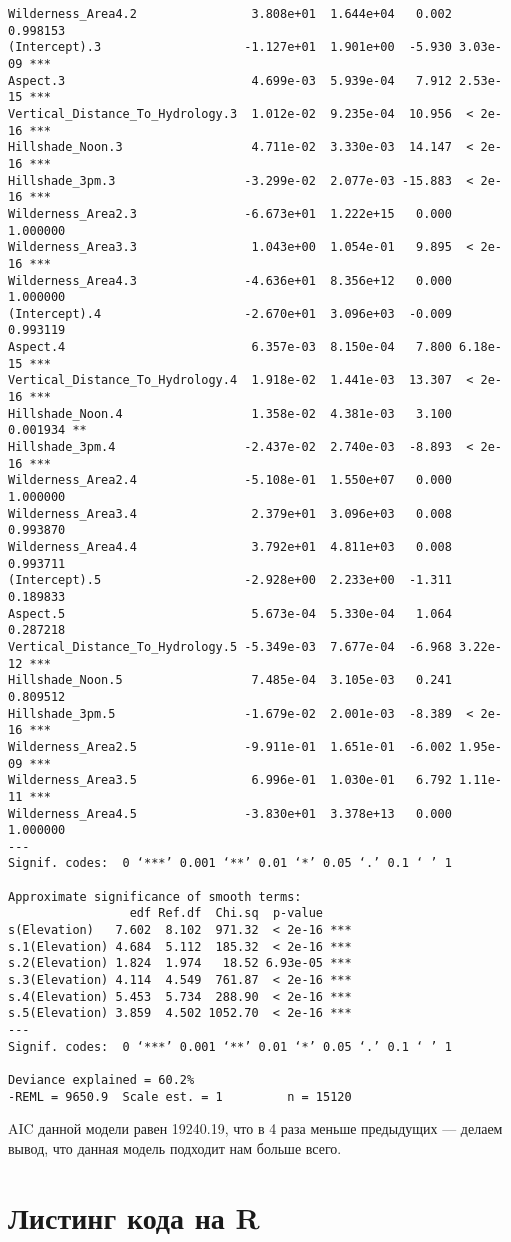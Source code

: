 \documentclass[12pt]{article}
\begin{document}
\begin{verbatim}
Wilderness_Area4.2                3.808e+01  1.644e+04   0.002 0.998153
(Intercept).3                    -1.127e+01  1.901e+00  -5.930 3.03e-09 ***
Aspect.3                          4.699e-03  5.939e-04   7.912 2.53e-15 ***
Vertical_Distance_To_Hydrology.3  1.012e-02  9.235e-04  10.956  < 2e-16 ***
Hillshade_Noon.3                  4.711e-02  3.330e-03  14.147  < 2e-16 ***
Hillshade_3pm.3                  -3.299e-02  2.077e-03 -15.883  < 2e-16 ***
Wilderness_Area2.3               -6.673e+01  1.222e+15   0.000 1.000000
Wilderness_Area3.3                1.043e+00  1.054e-01   9.895  < 2e-16 ***
Wilderness_Area4.3               -4.636e+01  8.356e+12   0.000 1.000000
(Intercept).4                    -2.670e+01  3.096e+03  -0.009 0.993119
Aspect.4                          6.357e-03  8.150e-04   7.800 6.18e-15 ***
Vertical_Distance_To_Hydrology.4  1.918e-02  1.441e-03  13.307  < 2e-16 ***
Hillshade_Noon.4                  1.358e-02  4.381e-03   3.100 0.001934 **
Hillshade_3pm.4                  -2.437e-02  2.740e-03  -8.893  < 2e-16 ***
Wilderness_Area2.4               -5.108e-01  1.550e+07   0.000 1.000000
Wilderness_Area3.4                2.379e+01  3.096e+03   0.008 0.993870
Wilderness_Area4.4                3.792e+01  4.811e+03   0.008 0.993711
(Intercept).5                    -2.928e+00  2.233e+00  -1.311 0.189833
Aspect.5                          5.673e-04  5.330e-04   1.064 0.287218
Vertical_Distance_To_Hydrology.5 -5.349e-03  7.677e-04  -6.968 3.22e-12 ***
Hillshade_Noon.5                  7.485e-04  3.105e-03   0.241 0.809512
Hillshade_3pm.5                  -1.679e-02  2.001e-03  -8.389  < 2e-16 ***
Wilderness_Area2.5               -9.911e-01  1.651e-01  -6.002 1.95e-09 ***
Wilderness_Area3.5                6.996e-01  1.030e-01   6.792 1.11e-11 ***
Wilderness_Area4.5               -3.830e+01  3.378e+13   0.000 1.000000
---
Signif. codes:  0 ‘***’ 0.001 ‘**’ 0.01 ‘*’ 0.05 ‘.’ 0.1 ‘ ’ 1

Approximate significance of smooth terms:
                 edf Ref.df  Chi.sq  p-value
s(Elevation)   7.602  8.102  971.32  < 2e-16 ***
s.1(Elevation) 4.684  5.112  185.32  < 2e-16 ***
s.2(Elevation) 1.824  1.974   18.52 6.93e-05 ***
s.3(Elevation) 4.114  4.549  761.87  < 2e-16 ***
s.4(Elevation) 5.453  5.734  288.90  < 2e-16 ***
s.5(Elevation) 3.859  4.502 1052.70  < 2e-16 ***
---
Signif. codes:  0 ‘***’ 0.001 ‘**’ 0.01 ‘*’ 0.05 ‘.’ 0.1 ‘ ’ 1

Deviance explained = 60.2%
-REML = 9650.9  Scale est. = 1         n = 15120
\end{verbatim}

AIC данной модели равен 19240.19, что в 4 раза меньше предыдущих --- делаем
вывод, что данная модель подходит нам больше всего.
\section{Листинг кода на R}

\end{document}
